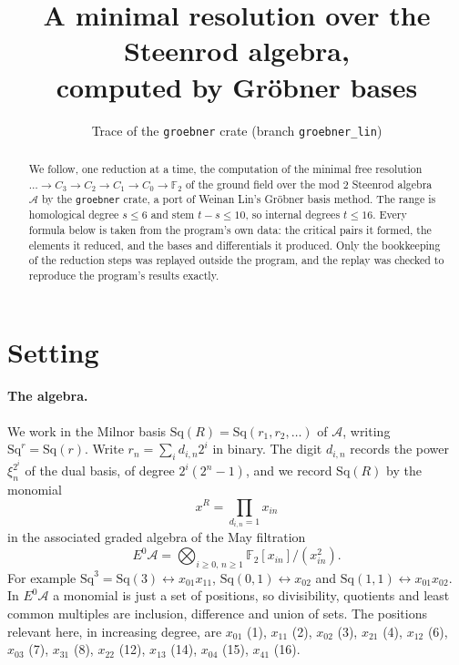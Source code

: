 \documentclass[11pt]{article}
\title{A minimal resolution over the Steenrod algebra,\\ computed by Gröbner bases}
\author{Trace of the \texttt{groebner} crate (branch \texttt{groebner\_lin})}
\date{}
\newcommand{\Sq}{\mathrm{Sq}}
\newcommand{\F}{\mathbb{F}_2}
\newcommand{\A}{\mathcal{A}}
\begin{document}
\maketitle

\begin{abstract}
We follow, one reduction at a time, the computation of the minimal free resolution
$\dots \to C_3 \to C_2 \to C_1 \to C_0 \to \F$ of the ground field over the mod $2$ Steenrod
algebra $\A$ by the \texttt{groebner} crate, a port of Weinan Lin's Gröbner basis method. The
range is homological degree $s \le 6$ and stem $t - s \le 10$, so internal degrees $t \le 16$.
Every formula below is taken from the program's own data: the critical pairs it formed, the
elements it reduced, and the bases and differentials it produced. Only the bookkeeping of the
reduction steps was replayed outside the program, and the replay was checked to reproduce the
program's results exactly.
\end{abstract}

\section{Setting}

\paragraph{The algebra.}
We work in the Milnor basis $\Sq(R) = \Sq(r_1, r_2, \dots)$ of $\A$, writing $\Sq^r = \Sq(r)$.
Write $r_n = \sum_i d_{i,n} 2^i$ in binary. The digit $d_{i,n}$ records the power
$\xi_n^{2^i}$ of the dual basis, of degree $2^i(2^n - 1)$, and we record $\Sq(R)$ by the
monomial
\[ x^R = \prod_{d_{i,n} = 1} x_{in} \]
in the associated graded algebra of the May filtration
\[ E^0\A = \bigotimes_{i \ge 0,\, n \ge 1} \F[x_{in}]/(x_{in}^2). \]
For example $\Sq^3 = \Sq(3) \leftrightarrow x_{01}x_{11}$, $\Sq(0,1) \leftrightarrow x_{02}$ and
$\Sq(1,1) \leftrightarrow x_{01}x_{02}$. In $E^0\A$ a monomial is just a set of positions, so
divisibility, quotients and least common multiples are inclusion, difference and union of sets.
The positions relevant here, in increasing degree, are
$x_{01}$ (1), $x_{11}$ (2), $x_{02}$ (3), $x_{21}$ (4), $x_{12}$ (6), $x_{03}$ (7), $x_{31}$ (8), $x_{22}$ (12), $x_{13}$ (14), $x_{04}$ (15), $x_{41}$ (16).
\end{document}
